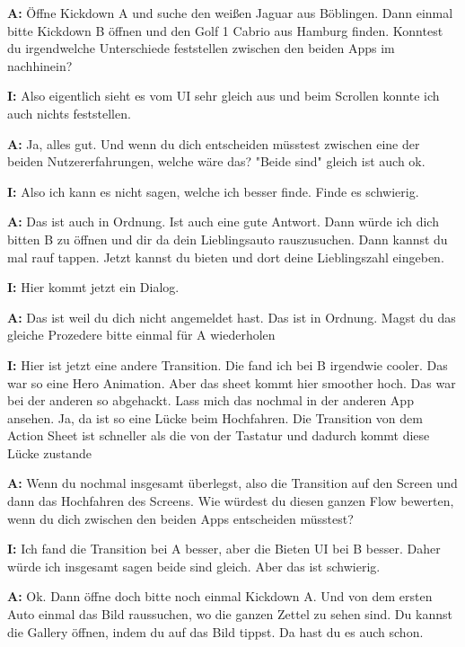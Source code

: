 \begin{myparindent}{0pt}

\textbf{A:} Öffne Kickdown A und suche den weißen Jaguar aus Böblingen. Dann einmal bitte Kickdown B öffnen und den Golf 1 Cabrio aus Hamburg finden. Konntest du irgendwelche Unterschiede feststellen zwischen den beiden Apps im nachhinein?

\textbf{I:} Also eigentlich sieht es vom UI sehr gleich aus und beim Scrollen konnte ich auch nichts feststellen. 

\textbf{A:} Ja, alles gut. Und wenn du dich entscheiden müsstest zwischen eine der beiden Nutzererfahrungen, welche wäre das? "Beide sind" gleich ist auch ok.

\textbf{I:} Also ich kann es nicht sagen, welche ich besser finde. Finde es schwierig. 

\textbf{A:} Das ist auch in Ordnung. Ist auch eine gute Antwort. Dann würde ich dich bitten B zu öffnen und dir da dein Lieblingsauto rauszusuchen. Dann kannst du mal rauf tappen. Jetzt kannst du bieten und dort deine Lieblingszahl eingeben.

\textbf{I:} Hier kommt jetzt ein Dialog.

\textbf{A:} Das ist weil du dich nicht angemeldet hast. Das ist in Ordnung. Magst du das gleiche Prozedere bitte einmal für A wiederholen 

\textbf{I:} Hier ist jetzt eine andere Transition. Die fand ich bei B irgendwie cooler. Das war so eine Hero Animation. Aber das sheet kommt hier smoother hoch. Das war bei der anderen so abgehackt. Lass mich das nochmal in der anderen App ansehen. Ja, da ist so eine Lücke beim Hochfahren. Die Transition von dem Action Sheet ist schneller als die von der Tastatur und dadurch kommt diese Lücke zustande

\textbf{A:}  Wenn du nochmal insgesamt überlegst, also die Transition auf den Screen und dann das Hochfahren des Screens. Wie würdest du diesen ganzen Flow bewerten, wenn du dich zwischen den beiden Apps entscheiden müsstest?

\textbf{I:} Ich fand die Transition bei A besser, aber die Bieten UI bei B besser. Daher würde ich insgesamt sagen beide sind gleich. Aber das ist schwierig.

\textbf{A:} Ok. Dann öffne doch bitte noch einmal Kickdown A. Und von dem ersten Auto einmal das Bild raussuchen, wo die ganzen Zettel zu sehen sind. Du kannst die Gallery öffnen, indem du auf das Bild tippst. Da hast du es auch schon.  


\end{myparindent}
